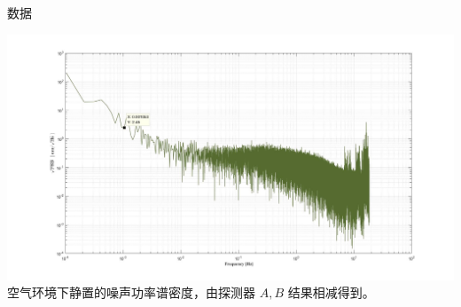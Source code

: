 \documentclass{beamer}
\begin{document}
\begin{frame}{数据}
\begin{minipage}{0.5\textwidth}
    \end{minipage}
\end{frame}

\begin{frame}
    \includegraphics[width=\linewidth, height=0.65\textheight]{image/7.jpg}
    空气环境下静置的噪声功率谱密度，由探测器 $A,B$ 结果相减得到。
\end{frame}
\end{document}
